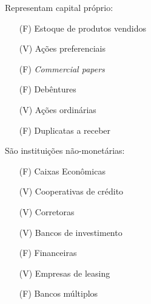 \documentclass{article}
\begin{document}
\begin{enumerate}
        Representam capital próprio:

        \begin{itemize}
            \item[(F)] Estoque de produtos vendidos
            \item[(V)] Ações preferenciais
            \item[(F)] \textit{Commercial papers}
            \item[(F)] Debêntures
            \item[(V)] Ações ordinárias
            \item[(F)] Duplicatas a receber
        \end{itemize}

        São instituições não-monetárias:

        \begin{itemize}
            \item[(F)] Caixas Econômicas
            \item[(V)] Cooperativas de crédito
            \item[(V)] Corretoras
            \item[(V)] Bancos de investimento
            \item[(F)] Financeiras
            \item[(V)] Empresas de leasing
            \item[(F)] Bancos múltiplos
        \end{itemize}
\end{enumerate}
\end{document}
